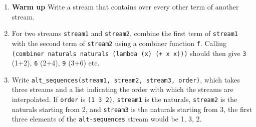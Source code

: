 \documentclass[a4paper]{book}
\begin{document}
\begin{enumerate}
\item \textbf{Warm up} Write a stream that contains over every other term of another stream.
\item For two streams {\tt stream1} and {\tt stream2}, combine the first term of {\tt stream1} with the second term of {\tt stream2} using a combiner function {\tt f}. Calling {\tt (combiner naturals naturals (lambda (x) (+ x x)))} should then give {\tt 3} (1+2), {\tt 6} (2+4), {\tt 9} (3+6) etc.
\item Write {\tt alt\_sequences(stream1, stream2, stream3, order)}, which takes three streams and a list indicating the order with which the streams are interpolated. If {\tt order} is {\tt (1 3 2)}, {\tt stream1} is the naturals, {\tt stream2} is the naturals starting from 2, and {\tt stream3} is the naturals starting from 3, the first three elements of the {\tt alt-sequences} stream would be 1, 3, 2.
\end{enumerate}
\end{document}
